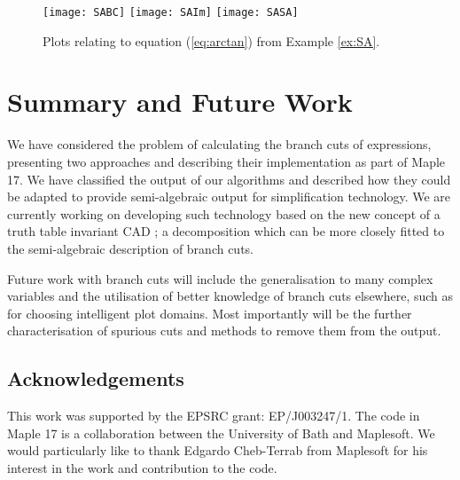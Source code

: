 \documentclass{llncs}
\begin{document}
\begin{figure}[ht] 
\begin{center}
\texttt{[image: SABC]}
\hspace*{0.3cm}
\texttt{[image: SAIm]}
\hspace*{0.3cm}
\texttt{[image: SASA]}
\end{center}
\caption{Plots relating to equation (\ref{eq:arctan}) from Example \ref{ex:SA}.} 
\label{fig:SA}
\end{figure}

\section{Summary and Future Work}

We have considered the problem of calculating the branch cuts of expressions, presenting two approaches and describing their implementation as part of {\sc Maple} 17.  We have classified the output of our algorithms and described how they could be adapted to provide semi-algebraic output for simplification technology.  We are currently working on developing such technology based on the new concept of a truth table invariant CAD \cite{BDEMW13, BDEW13}; a decomposition which can be more closely fitted to the semi-algebraic description of branch cuts.  

Future work with branch cuts will include the generalisation to many complex variables and the utilisation of better knowledge of branch cuts elsewhere, such as for choosing intelligent plot domains.  Most importantly will be the further characterisation of spurious cuts and methods to remove them from the output.


\subsection*{Acknowledgements}

This work was supported by the EPSRC grant: EP/J003247/1.  The code in {\sc Maple} 17 is a collaboration between the University of Bath and Maplesoft.  We would particularly like to thank Edgardo Cheb-Terrab from Maplesoft for his interest in the work and contribution to the code.  
\end{document}

